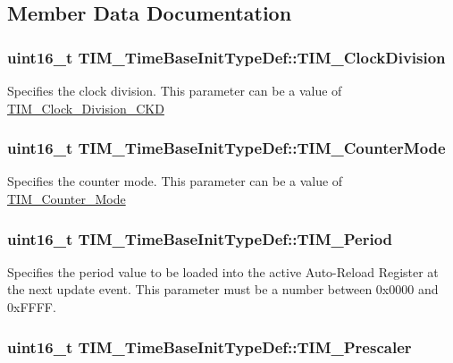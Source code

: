 \subsection{Member Data Documentation}
\hypertarget{structTIM__TimeBaseInitTypeDef_ab473f51adaa9474702e454fc8c24a407}{
\subsubsection[{TIM\_\-ClockDivision}]{\setlength{\rightskip}{0pt plus 5cm}uint16\_\-t {\bf TIM\_\-TimeBaseInitTypeDef::TIM\_\-ClockDivision}}}
\label{structTIM__TimeBaseInitTypeDef_ab473f51adaa9474702e454fc8c24a407}
Specifies the clock division. This parameter can be a value of \hyperlink{group__TIM__Clock__Division__CKD}{TIM\_\-Clock\_\-Division\_\-CKD} \hypertarget{structTIM__TimeBaseInitTypeDef_a0de4138cd939566bc667f21df089e195}{
\subsubsection[{TIM\_\-CounterMode}]{\setlength{\rightskip}{0pt plus 5cm}uint16\_\-t {\bf TIM\_\-TimeBaseInitTypeDef::TIM\_\-CounterMode}}}
\label{structTIM__TimeBaseInitTypeDef_a0de4138cd939566bc667f21df089e195}
Specifies the counter mode. This parameter can be a value of \hyperlink{group__TIM__Counter__Mode}{TIM\_\-Counter\_\-Mode} \hypertarget{structTIM__TimeBaseInitTypeDef_aeb5b90dc8f8a1ab85584e732789b2ee4}{
\subsubsection[{TIM\_\-Period}]{\setlength{\rightskip}{0pt plus 5cm}uint16\_\-t {\bf TIM\_\-TimeBaseInitTypeDef::TIM\_\-Period}}}
\label{structTIM__TimeBaseInitTypeDef_aeb5b90dc8f8a1ab85584e732789b2ee4}
Specifies the period value to be loaded into the active Auto-\/Reload Register at the next update event. This parameter must be a number between 0x0000 and 0xFFFF. \hypertarget{structTIM__TimeBaseInitTypeDef_a6d3c8632780db819b2eb811e71ce251e}{
\subsubsection[{TIM\_\-Prescaler}]{\setlength{\rightskip}{0pt plus 5cm}uint16\_\-t {\bf TIM\_\-TimeBaseInitTypeDef::TIM\_\-Prescaler}}}
